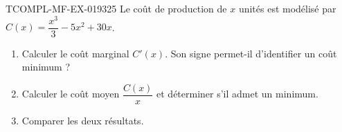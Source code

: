 \begin{exercice}{TCOMPL-MF-EX-019}{3}{25}
Le coût de production de $x$ unités est modélisé par $C(x) = \dfrac{x^3}{3} - 5x^2 + 30x$.
\begin{enumerate}
  \item Calculer le coût marginal $C'(x)$. Son signe permet-il d'identifier un coût minimum ?
  \item Calculer le coût moyen $\dfrac{C(x)}{x}$ et déterminer s'il admet un minimum.
  \item Comparer les deux résultats.
\end{enumerate}

\end{exercice}
